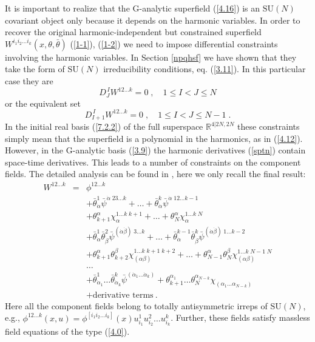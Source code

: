 \documentclass[a4paper,12pt]{article}
\begin{document}
It is important to realize that the G-analytic superfield 
(\ref{4.16}) is an $\mbox{SU}(N)$ covariant object only because it 
depends on the harmonic variables. In order to recover the 
original harmonic-independent but constrained superfield $ 
W^{i_1i_2\ldots i_k}(x,\theta,\bar\theta)$ (\ref{1-1}), 
(\ref{1-2}) we need to impose differential constraints involving 
the harmonic variables. In Section \ref{npqhsf} we have shown that 
they take the form of $\mbox{SU}(N)$ irreducibility conditions, 
eq. (\ref{3.11}). In this particular case they are 
\begin{equation}
  \label{a10'}
  D^{\,I}_J W^{12\ldots k} = 0\;, \quad 1\leq I<J \leq N
\end{equation}
or the equivalent set 
\begin{equation}\label{a111}
  D^{\,I}_{I+1} W^{12\ldots k} = 0\;, \quad 1\leq I<J \leq N-1\;. 
\end{equation}
In the initial real basis (\ref{7.2.2}) of the full superspace 
${\mathbb R}^{4\vert 2N,2N}$ these constraints simply mean that 
the superfield is a polynomial in the harmonics, as in 
(\ref{4.12}). However, in the G-analytic basis (\ref{3.9}) the 
harmonic derivatives (\ref{sptn}) contain space-time derivatives. 
This leads to a number of constraints on the component fields. The 
detailed analysis can be found in \cite{FS1}, here we only recall 
the final result: 
\begin{eqnarray}
 W^{12\ldots k} &=&\phi^{12\ldots k} \nonumber\\
 &&+\bar\theta^1_{\dot\alpha}\bar\psi^{\dot\alpha\; 23\ldots k} + 
\ldots + \bar\theta^k_{\dot\alpha}\bar\psi^{\dot\alpha\; 12\ldots 
k-1} \nonumber\\ 
 &&+ \theta^\alpha_{k+1}\chi_{\alpha}^{1\ldots k\; k+1}  + \ldots + 
\theta^\alpha_{N}\chi_{\alpha}^{1\ldots k\; N} \nonumber\\ 
 &&+\bar\theta^1_{\dot\alpha} \bar\theta^2_{\dot\beta} 
\bar\psi^{(\dot\alpha\dot\beta)\; 3\ldots k} + \ldots + 
\bar\theta^{k-1}_{\dot\alpha} \bar\theta^k_{\dot\beta} 
\bar\psi^{(\dot\alpha\dot\beta)\; 1\ldots k-2}\nonumber\\ 
 && + \theta^\alpha_{k+1} \theta^\beta_{ k+2} 
\chi_{(\alpha\beta)}^{1\ldots k\; k+1\; k+2} 
 + \ldots + \theta^\alpha_{N-1} \theta^\beta_{N} 
\chi_{(\alpha\beta)}^{1\ldots k\; N-1\; N}\nonumber\\ 
 &&  \ldots\nonumber\\ 
 && + \bar\theta^1_{\dot\alpha_1}\ldots \bar\theta^k_{\dot\alpha_k} 
\bar\psi^{(\dot\alpha_1\ldots\dot\alpha_k)} 
+\theta^{\alpha_1}_{k+1} \ldots \theta^{\alpha_{N-k}}_{N} 
\chi_{(\alpha_1\ldots\alpha_{N-k})} \nonumber\\ 
 && + \mbox{derivative terms}\ . \label{expan} 
\end{eqnarray}
Here all the component fields belong to totally antisymmetric 
irreps of $\mbox{SU}(N)$, e.g., $\phi^{12\ldots k}(x,u) = 
\phi^{[i_1i_2\ldots i_k]}(x) u^1_{i_1} u^2_{i_2}\ldots u^k_{i_k}$. 
Further, these fields satisfy massless field equations of the type 
(\ref{4.0}). 
\end{document}
